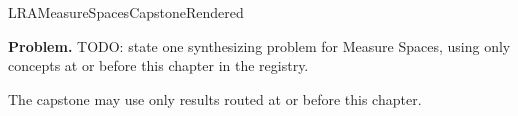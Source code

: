 \ifcsname LRAMeasureSpacesCapstoneRendered\endcsname
\else
\expandafter\gdef\csname LRAMeasureSpacesCapstoneRendered\endcsname{}

\newpage
{}
\label{cap:measure-spaces}

\begin{tcolorbox}[
  colback=gray!6,
  colframe=gray!40,
  arc=2pt,
  left=8pt, right=8pt, top=6pt, bottom=6pt,
  title={\small\textbf{Capstone Problem}},
  fonttitle=\small\bfseries
]
\textbf{Problem.}
TODO: state one synthesizing problem for Measure Spaces, using only concepts at or
before this chapter in the registry.
\end{tcolorbox}

\begin{remark*}
The capstone may use only results routed at or before this chapter.
\end{remark*}

\clearpage
\fi

